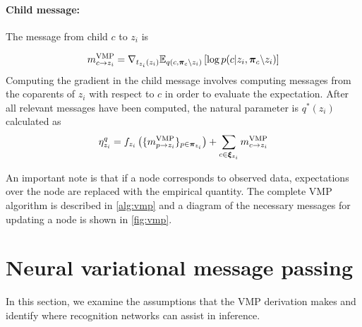 \paragraph{Child message:}
The message from child $c$ to $z_i$ is

\begin{equation} \label{eq:childmessage}
    m^{\text{VMP}}_{c \rightarrow z_i} = \nabla_{t_{z_i}(z_i)} \mathbb{E}_{q(c, \bm{\pi}_{c} \backslash z_i)}\left[\log p(c | z_i, \bm{\pi}_{c} \backslash z_i)\right]
\end{equation}
Computing the gradient in the child message involves
computing messages from the coparents of $z_i$ with respect to $c$ in order to evaluate the expectation.
After all relevant messages
have been computed, the natural parameter is $q^*(z_i)$ calculated as
\begin{equation}
    \label{eq:vmpparam}
   \eta^q_{z_i} = f_{z_i}\left(\{m^{\text{VMP}}_{p \rightarrow z_i}\}_{p \in \bm{\pi}_{z_i}}\right) + \sum_{c \in \bm{\xi}_{z_i}} m^{\text{VMP}}_{c \rightarrow z_i}
\end{equation}

An important note is that if a node corresponds to observed data,
expectations over the node are replaced with the empirical quantity.
The complete VMP algorithm is described in \autoref{alg:vmp} and
a diagram of the necessary messages for updating a node
is shown in \autoref{fig:vmp}.

\section{Neural variational message passing}
\label{sec:nvmp}

In this section, we examine
the assumptions that the VMP derivation makes
and identify where recognition networks
can assist in inference.

